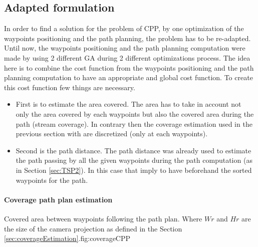 		\subsection{Adapted formulation }
In order to find a solution for the problem of CPP, by one optimization of the waypoints positioning and the path planning, the problem has to be re-adapted.
Until now, the waypoints positioning and the path planning computation were made by using 2 different GA during 2 different optimizations process. The idea here is to combine the cost function from the waypoints positioning and the path planning computation to have an appropriate and global cost function.
To create this cost function few things are necessary.
\begin{itemize}
	\item First is to estimate the area covered. The area has to take in account not only the area covered by each waypoints but also the covered area during the path (stream coverage). In contrary then the coverage estimation used in the previous section with are discretized (only at each waypoints). %
	\item Second is the path distance. The path distance was already used to estimate the path passing  by all the given waypoints during the path computation (as in Section \ref{sec:TSP2}). In this case that imply to have beforehand the sorted waypoints for the path.
\end{itemize}

\paragraph*{Coverage path plan estimation}\label{par:CPPestimation}

  \begin{mfigures}[!]{Covered area between waypoints following the path plan. Where $Wr$ and $Hr$ are the size of the camera projection  as defined in the Section \ref{sec:coverageEstimation}.}{fig:coverageCPP} \centering

\end{mfigures}  



